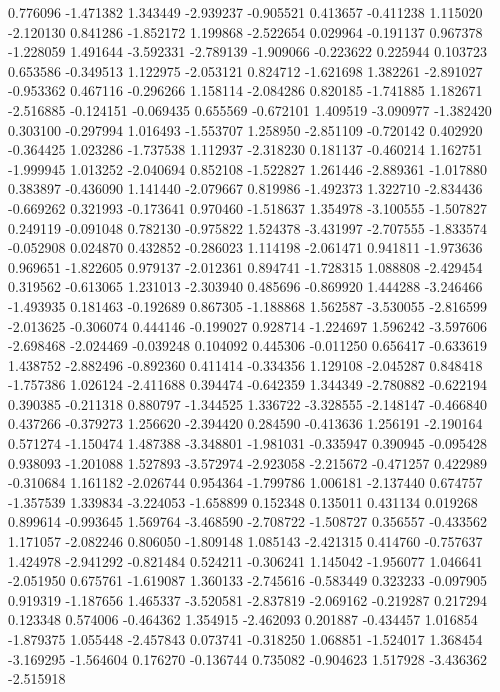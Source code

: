 0.776096
-1.471382
1.343449
-2.939237
-0.905521
0.413657
-0.411238
1.115020
-2.120130
0.841286
-1.852172
1.199868
-2.522654
0.029964
-0.191137
0.967378
-1.228059
1.491644
-3.592331
-2.789139
-1.909066
-0.223622
0.225944
0.103723
0.653586
-0.349513
1.122975
-2.053121
0.824712
-1.621698
1.382261
-2.891027
-0.953362
0.467116
-0.296266
1.158114
-2.084286
0.820185
-1.741885
1.182671
-2.516885
-0.124151
-0.069435
0.655569
-0.672101
1.409519
-3.090977
-1.382420
0.303100
-0.297994
1.016493
-1.553707
1.258950
-2.851109
-0.720142
0.402920
-0.364425
1.023286
-1.737538
1.112937
-2.318230
0.181137
-0.460214
1.162751
-1.999945
1.013252
-2.040694
0.852108
-1.522827
1.261446
-2.889361
-1.017880
0.383897
-0.436090
1.141440
-2.079667
0.819986
-1.492373
1.322710
-2.834436
-0.669262
0.321993
-0.173641
0.970460
-1.518637
1.354978
-3.100555
-1.507827
0.249119
-0.091048
0.782130
-0.975822
1.524378
-3.431997
-2.707555
-1.833574
-0.052908
0.024870
0.432852
-0.286023
1.114198
-2.061471
0.941811
-1.973636
0.969651
-1.822605
0.979137
-2.012361
0.894741
-1.728315
1.088808
-2.429454
0.319562
-0.613065
1.231013
-2.303940
0.485696
-0.869920
1.444288
-3.246466
-1.493935
0.181463
-0.192689
0.867305
-1.188868
1.562587
-3.530055
-2.816599
-2.013625
-0.306074
0.444146
-0.199027
0.928714
-1.224697
1.596242
-3.597606
-2.698468
-2.024469
-0.039248
0.104092
0.445306
-0.011250
0.656417
-0.633619
1.438752
-2.882496
-0.892360
0.411414
-0.334356
1.129108
-2.045287
0.848418
-1.757386
1.026124
-2.411688
0.394474
-0.642359
1.344349
-2.780882
-0.622194
0.390385
-0.211318
0.880797
-1.344525
1.336722
-3.328555
-2.148147
-0.466840
0.437266
-0.379273
1.256620
-2.394420
0.284590
-0.413636
1.256191
-2.190164
0.571274
-1.150474
1.487388
-3.348801
-1.981031
-0.335947
0.390945
-0.095428
0.938093
-1.201088
1.527893
-3.572974
-2.923058
-2.215672
-0.471257
0.422989
-0.310684
1.161182
-2.026744
0.954364
-1.799786
1.006181
-2.137440
0.674757
-1.357539
1.339834
-3.224053
-1.658899
0.152348
0.135011
0.431134
0.019268
0.899614
-0.993645
1.569764
-3.468590
-2.708722
-1.508727
0.356557
-0.433562
1.171057
-2.082246
0.806050
-1.809148
1.085143
-2.421315
0.414760
-0.757637
1.424978
-2.941292
-0.821484
0.524211
-0.306241
1.145042
-1.956077
1.046641
-2.051950
0.675761
-1.619087
1.360133
-2.745616
-0.583449
0.323233
-0.097905
0.919319
-1.187656
1.465337
-3.520581
-2.837819
-2.069162
-0.219287
0.217294
0.123348
0.574006
-0.464362
1.354915
-2.462093
0.201887
-0.434457
1.016854
-1.879375
1.055448
-2.457843
0.073741
-0.318250
1.068851
-1.524017
1.368454
-3.169295
-1.564604
0.176270
-0.136744
0.735082
-0.904623
1.517928
-3.436362
-2.515918
